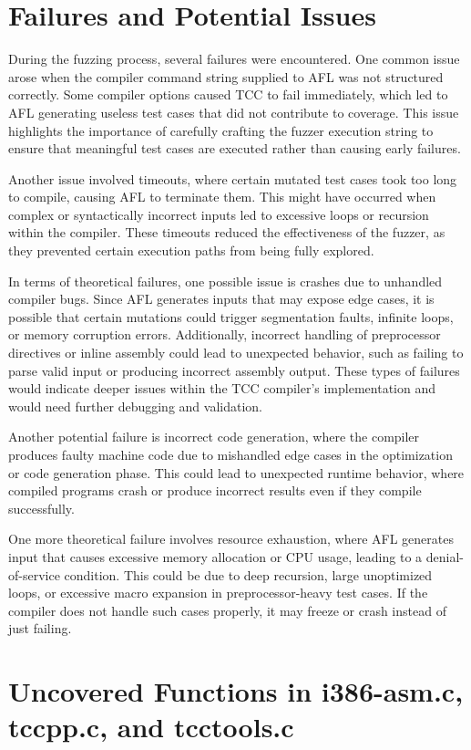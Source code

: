\documentclass[conference]{IEEEtran}
\begin{document}
\section{Failures and Potential Issues}
During the fuzzing process, several failures were encountered. One common issue arose when the compiler command string supplied to AFL was not structured correctly. Some compiler options caused TCC to fail immediately, which led to AFL generating useless test cases that did not contribute to coverage. This issue highlights the importance of carefully crafting the fuzzer execution string to ensure that meaningful test cases are executed rather than causing early failures.

Another issue involved timeouts, where certain mutated test cases took too long to compile, causing AFL to terminate them. This might have occurred when complex or syntactically incorrect inputs led to excessive loops or recursion within the compiler. These timeouts reduced the effectiveness of the fuzzer, as they prevented certain execution paths from being fully explored.

In terms of theoretical failures, one possible issue is crashes due to unhandled compiler bugs. Since AFL generates inputs that may expose edge cases, it is possible that certain mutations could trigger segmentation faults, infinite loops, or memory corruption errors. Additionally, incorrect handling of preprocessor directives or inline assembly could lead to unexpected behavior, such as failing to parse valid input or producing incorrect assembly output. These types of failures would indicate deeper issues within the TCC compiler's implementation and would need further debugging and validation.

Another potential failure is incorrect code generation, where the compiler produces faulty machine code due to mishandled edge cases in the optimization or code generation phase. This could lead to unexpected runtime behavior, where compiled programs crash or produce incorrect results even if they compile successfully.

One more theoretical failure involves resource exhaustion, where AFL generates input that causes excessive memory allocation or CPU usage, leading to a denial-of-service condition. This could be due to deep recursion, large unoptimized loops, or excessive macro expansion in preprocessor-heavy test cases. If the compiler does not handle such cases properly, it may freeze or crash instead of just failing.

\section{Uncovered Functions in i386-asm.c, tccpp.c, and tcctools.c}
\end{document}

